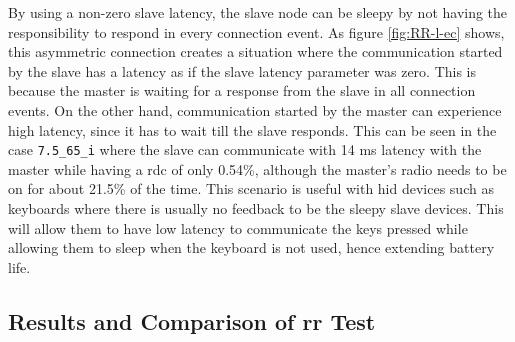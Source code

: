 By using a non-zero slave latency, the slave node can be sleepy by not having the responsibility to respond in every connection event. As figure \ref{fig:RR-l-ec} shows, this asymmetric connection creates a situation where the communication started by the slave has a latency as if the slave latency parameter was zero. This is because the master is waiting for a response from the slave in all connection events. On the other hand, communication started by the master can experience high latency, since it has to wait till the slave responds. This can be seen in the case \texttt{7.5\_65\_i} where the slave can communicate with 14 ms latency with the master while having a \gls{rdc} of only 0.54\%, although the master's radio needs to be on for about 21.5\% of the time. This scenario is useful with \gls{hid} devices such as keyboards where there is usually no feedback to be the sleepy slave devices. This will allow them to have low latency to communicate the keys pressed while allowing them to sleep when the keyboard is not used, hence extending battery life.
%
%

\subsection{Results and Comparison of \texorpdfstring{\acrlong{rr}}{Request-Response} Test}

